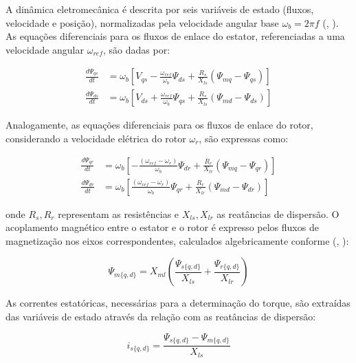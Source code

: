 \documentclass[a4paper]{ifacconf}
\begin{document}
A dinâmica eletromecânica é descrita por seis variáveis de estado (fluxos, velocidade e posição), normalizadas pela velocidade angular base $\omega_b = 2\pi f$ (\citeauthor{usta2024mathematical}, \citeyear{usta2024mathematical}). As equações diferenciais para os fluxos de enlace do estator, referenciadas a uma velocidade angular $\omega_{ref}$, são dadas por:

\begin{align}
\frac{d\Psi_{qs}}{dt} &= \omega_b \left[V_{qs} - \frac{\omega_{ref}}{\omega_b}\Psi_{ds} + \frac{R_s}{X_{ls}}(\Psi_{mq} - \Psi_{qs})\right] \label{eq:dPsiqs} \\[4pt]
\frac{d\Psi_{ds}}{dt} &= \omega_b \left[V_{ds} + \frac{\omega_{ref}}{\omega_b}\Psi_{qs} + \frac{R_s}{X_{ls}}(\Psi_{md} - \Psi_{ds})\right] \label{eq:dPsids}
\end{align}

Analogamente, as equações diferenciais para os fluxos de enlace do rotor, considerando a velocidade elétrica do rotor $\omega_r$, são expressas como:

\begin{align}
\frac{d\Psi_{qr}}{dt} &= \omega_b \left[-\frac{(\omega_{ref} - \omega_r)}{\omega_b}\Psi_{dr} + \frac{R_r}{X_{lr}}(\Psi_{mq} - \Psi_{qr})\right] \label{eq:dPsiqr} \\[4pt]
\frac{d\Psi_{dr}}{dt} &= \omega_b \left[\frac{(\omega_{ref} - \omega_r)}{\omega_b}\Psi_{qr} + \frac{R_r}{X_{lr}}(\Psi_{md} - \Psi_{dr})\right] \label{eq:dPsidr}
\end{align}

onde $R_s, R_r$ representam as resistências e $X_{ls}, X_{lr}$ as reatâncias de dispersão. O acoplamento magnético entre o estator e o rotor é expresso pelos fluxos de magnetização nos eixos correspondentes, calculados algebricamente conforme (\citeauthor{aktaibi2011dynamic}, \citeyear{aktaibi2011dynamic}):

\begin{equation}
    \Psi_{m\{q,d\}} = X_{ml} \left( \frac{\Psi_{s\{q,d\}}}{X_{ls}} + \frac{\Psi_{r\{q,d\}}}{X_{lr}} \right)
    \label{eq:psim}
\end{equation}

As correntes estatóricas, necessárias para a determinação do torque, são extraídas das variáveis de estado através da relação com as reatâncias de dispersão:

\begin{equation}
    i_{s\{q,d\}} = \frac{\Psi_{s\{q,d\}} - \Psi_{m\{q,d\}}}{X_{ls}}
    \label{eq:is}
\end{equation}
\end{document}
